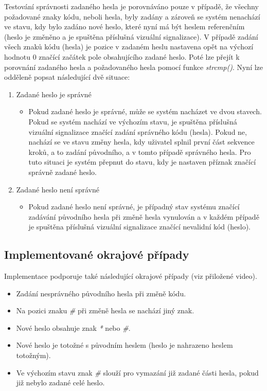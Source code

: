 \documentclass[a4paper, 12pt]{article}
\begin{document}
Testování správnosti zadaného hesla je porovnáváno pouze v případě, že všechny požadované znaky kódu, neboli hesla, byly zadány a zároveň se systém nenachází ve stavu, kdy bylo zadáno nové heslo, které nyní má být heslem referenčním (heslo je změněno a je spuštěna příslušná vizuální signalizace). V případě zadání všech znaků kódu (hesla) je pozice v zadaném heslu nastavena opět na výchozí hodnotu 0 značící začátek pole obsahujícího zadané heslo. Poté lze přejít k porovnání zadaného hesla a požadovaného hesla pomocí funkce \textit{strcmp()}. Nyní lze odděleně popsat následující dvě situace:

\begin{enumerate}[label=(\alph*)]
    \item Zadané heslo je správné

    \begin{itemize}
        \item Pokud zadané heslo je správné, může se systém nacházet ve dvou stavech. Pokud se systém nachází ve výchozím stavu, je spuštěna příslušná vizuální signalizace značící zadání správného kódu (hesla). Pokud ne, nachází se ve stavu změny hesla, kdy uživatel splnil první část sekvence kroků, a to zadání původního, a v tomto případě správného hesla. Pro tuto situaci je systém přepnut do stavu, kdy je nastaven příznak značící správně zadané heslo.
    \end{itemize}
    
    \item Zadané heslo není správné

    \begin{itemize}
        \item Pokud zadané heslo není správné, je případný stav systému značící zadávání původního hesla při změně hesla vynulován a v každém případě je spuštěna příslušná vizuální signalizace značící nevalidní kód (heslo).
    \end{itemize}
    
\end{enumerate}

\subsection{Implementované okrajové případy}
Implementace podporuje také následující okrajové případy (viz přiložené video).

\begin{itemize}
    \item Zadání nesprávného původního hesla při změně kódu.
    \item Na pozici znaku \textit{\#} při změně hesla se nachází jiný znak.
    \item Nové heslo obsahuje znak \textit{*} nebo \textit{\#}.
    \item Nové heslo je totožné s původním heslem (heslo je nahrazeno heslem totožným).
    \item Ve výchozím stavu znak \textit{\#} slouží pro vymazání již zadané části hesla, pokud již nebylo zadané celé heslo.
\end{itemize}
\end{document}
